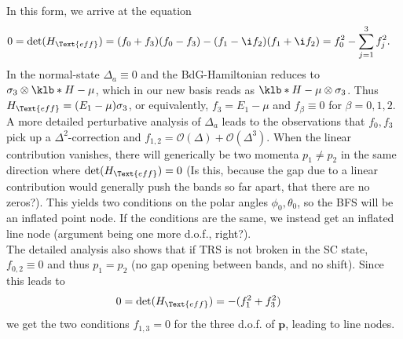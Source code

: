 \documentclass[english, parskip=full]{scrartcl}
\newcommand{\qna}[1]{\color{red}#1\color{black}}
\begin{document}
In this form, we arrive at the equation
\begin{align}
0 &= \det (H_\Text{eff}) = (f_0 + f_3)(f_0-f_3) - (f_1 -\i f_2) (f_1 + \i f_2) = f_0^2 - \sum_{j=1}^3 f_j^2.
\end{align}
In the normal-state $\Delta_a \equiv 0$ and the BdG-Hamiltonian reduces to $\sigma_3\otimes \klb*{H - \mu }$, which in our new basis reads as $\klb*{H - \mu } \otimes \sigma_3$.
Thus $H_\Text{eff} = (E_1 - \mu) \sigma_3$, or equivalently, $f_3 = E_1 - \mu$ and $f_\beta \equiv 0$ for $\beta=0,1,2$.\\
A more detailed perturbative analysis of $\Delta_a$ leads to the observations that $f_0,f_3$ pick up a $\Delta^2$-correction and $f_{1,2} = \mathcal{O}(\Delta) + \mathcal{O}(\Delta^3)$.
When the linear contribution vanishes, there will generically be two momenta $p_1\neq p_2$ in the same direction where $\det (H_\Text{eff}) = 0$ (\qna{Is this, because the gap due to a linear contribution would generally push the bands so far apart, that there are no zeros?}).
This yields two conditions on the polar angles $\phi_0,\theta_0$, so the BFS will be an inflated point node.
If the conditions are the same, we instead get an inflated line node (\qna{argument being one more d.o.f., right?}).\\
The detailed analysis also shows that if TRS is not broken in the SC state, $f_{0,2} \equiv 0$ and thus $p_1 = p_2$ (no gap opening between bands, and no shift).
Since this leads to 
\begin{align}
0 &= \det (H_\Text{eff}) = -(f_1^2 + f_3^2)
\end{align}
we get the two conditions $f_{1,3} = 0$ for the three d.o.f. of $\textbf{p}$, leading to line nodes.
\end{document}
